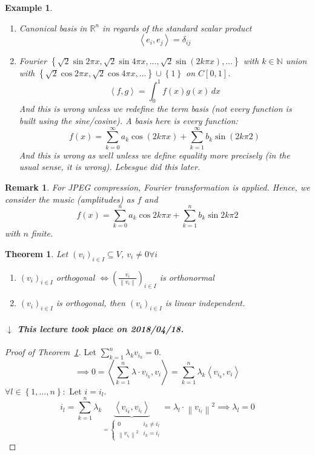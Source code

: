 \documentclass[a4paper]{article}
\newcounter{lecref}[section]
\numberwithin{lecref}{section}
\newtheorem{theorem}[lecref]{Theorem}
\newtheorem{example}[lecref]{Example}
\newtheorem*{Remark}{Remark}
\newcommand{\set}[1]{\left\{#1\right\}}
\newcommand{\ip}[2]{\left\langle#1,#2\right\rangle} %
\newcommand{\angel}[1]{\left\langle#1\right\rangle}
\newcommand{\norm}[1]{\left\|#1\right\|}
\newcommand{\dateref}[1]{%
  \begin{mdframed}[backgroundcolor=gray!10,innerbottommargin=0pt,innertopmargin=0pt]
    \paragraph{\textit{$\downarrow$ This lecture took place on #1.}}%
  \end{mdframed}%
}
\begin{document}
\begin{example} %
  \begin{enumerate}
    \item Canonical basis in $\mathbb R^n$ in regards of the standard scalar product
      \[ \ip{e_i}{e_j} = \delta_{ij} \]
    \item Fourier $\set{\sqrt 2 \sin{2\pi x}, \sqrt2 \sin{4\pi x}, \ldots, \sqrt2 \sin(2k \pi x), \ldots}$ with $k \in \mathbb N$
      union with $\set{\sqrt2 \cos{2\pi x}, \sqrt2 \cos{4\pi x}, \ldots} \cup \set{\mathfrak 1}$
      on $C[0,1]$.
      \[ \ip fg = \int_0^1 f(x) g(x) \, dx \]
      And this is wrong unless we redefine the term basis (not every function is built using the sine/cosine).
      A basis here is every function:
      \[ f(x) = \sum_{k=0}^\infty a_k \cos(2k \pi x) + \sum_{k=1}^\infty b_k \sin(2k \pi 2) \]
      And this is wrong as well unless we define equality more precisely (in the usual sense, it is wrong).
      Lebesgue did this later.
  \end{enumerate}
\end{example}

\begin{Remark}
  For JPEG compression, Fourier transformation is applied. Hence, we consider
  the music (amplitudes) as $f$ and
  \[ f(x) = \sum_{k=0}^n a_k \cos{2k \pi x} + \sum_{k=1}^n b_k \sin{2k \pi 2} \]
  with $n$ finite.
\end{Remark}

\begin{theorem} %
  \label{thm838}
  Let $(v_i)_{i \in I} \subseteq V$, $v_i \neq 0 \forall i$
  \begin{enumerate}
    \item $(v_i)_{i \in I}$ orthogonal $\iff \left(\frac{v_i}{\norm{v_i}}\right)_{i \in I}$ is orthonormal
    \item $(v_i)_{i \in I}$ is orthogonal, then $(v_i)_{i \in I}$ is linear independent.
  \end{enumerate}
\end{theorem}

\dateref{2018/04/18}


\begin{proof}[Proof of Theorem~\ref{thm838}]
  Let $\sum_{k=1}^n \lambda_k v_{i_k} = 0$.
  \[ \implies 0 = \angel{\sum_{k=1}^n \lambda \cdot v_{i_k}, v_i} = \sum_{k=1}^n \lambda_k \angel{v_{i_k}, v_i} \]
  $\forall l \in \set{1, \ldots, n}:$ Let $i = i_l$.
  \[
    i_l
      = \sum_{k=1}^n \lambda_k \underbrace{\angel{v_{i_k}, v_{i_l}}}_{= \begin{cases} 0 & i_k \neq i_l \\ \norm{v_{i_l}}^2 & i_k = i_l \end{cases}}
      = \lambda_l \cdot \norm{v_{i_l}}^2 \implies \lambda_l = 0 \]
\end{proof}
\end{document}
